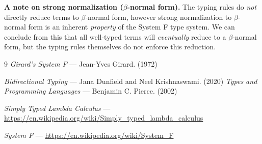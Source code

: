 \documentclass[11pt]{article}
\begin{document}
\textbf{A note on strong normalization ($\beta$-normal form).}
The typing rules do \textit{not} directly reduce terms to $\beta$-normal form, however strong normalization to $\beta$-normal form
is an inherent \textit{property} of the System F type system. We can conclude from this that all well-typed terms will \textit{eventually}
reduce to a $\beta$-normal form, but the typing rules themselves do not enforce this reduction.

\begin{thebibliography}{9}
    \textit{Girard's System F} ---
    Jean-Yves Girard. (1972)

    \textit{Bidirectional Typing} ---
    Jana Dunfield and Neel Krishnaswami. (2020)
    \textit{Types and Programming Languages} ---
    Benjamin C. Pierce. (2002)

    \textit{Simply Typed Lambda Calculus} ---
    \url{https://en.wikipedia.org/wiki/Simply_typed_lambda_calculus}

    \textit{System F} ---
    \url{https://en.wikipedia.org/wiki/System_F}
\end{thebibliography}
\end{document}
